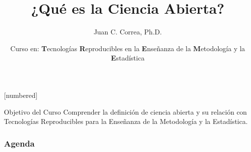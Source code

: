 \documentclass{beamer}
\begin{document}



\author[Juan C. Correa \textcolor{white}{(\url{https://correajc.com}})]{Juan C. Correa, Ph.D.}
\title[¿Qué es la Ciencia Abierta?]{¿Qué es la Ciencia Abierta?}
[numbered]
\date[Bogotá, Mayo-2021]{Curso en: \textbf{T}ecnologías \textbf{R}eproducibles en la \textbf{E}nseñanza de la \textbf{M}etodología y la \textbf{E}stadística}


\begin{frame}
	\titlepage
\end{frame}

\begin{frame}
\begin{block}{Objetivo del Curso}
\vspace{0.3cm}
Comprender la definición de ciencia abierta y su relación con Tecnologías Reproducibles para la Enseñanza de la Metodología y la Estadística.  
\end{block}
\end{frame}



\begin{frame}
\frametitle{Agenda} 
\tableofcontents
\end{frame}


\end{document}
